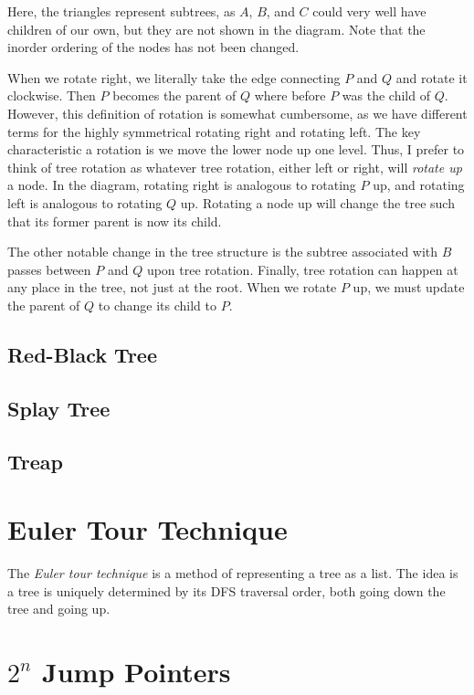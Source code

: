 \documentclass[11pt]{book}
\begin{document}
Here, the triangles represent subtrees, as $A$, $B$, and $C$ could very well have children of our own, but they are not shown in the diagram. Note that the inorder ordering of the nodes has not been changed.

When we rotate right, we literally take the edge connecting $P$ and $Q$ and rotate it clockwise. Then $P$ becomes the parent of $Q$ where before $P$ was the child of $Q$. However, this definition of rotation is somewhat cumbersome, as we have different terms for the highly symmetrical rotating right and rotating left. The key characteristic a rotation is we move the lower node up one level. Thus, I prefer to think of tree rotation as whatever tree rotation, either left or right, will \textit{rotate up} a node. In the diagram, rotating right is analogous to rotating $P$ up, and rotating left is analogous to rotating $Q$ up. Rotating a node up will change the tree such that its former parent is now its child.

The other notable change in the tree structure is the subtree associated with $B$ passes between $P$ and $Q$ upon tree rotation. Finally, tree rotation can happen at any place in the tree, not just at the root. When we rotate $P$ up, we must update the parent of $Q$ to change its child to $P$.

\subsection{Red-Black Tree}

\subsection{Splay Tree}

\subsection{Treap}



\section{Euler Tour Technique}

The \textit{Euler tour technique} is a method of representing a tree as a list. The idea is a tree is uniquely determined by its DFS traversal order, both going down the tree and going up.

\section{$2^n$ Jump Pointers}
\end{document}
